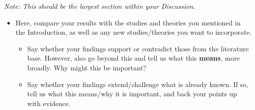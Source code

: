 \documentclass[
  english,
  letterpaper,
  DIV=11,
  numbers=noendperiod]{scrreprt}
\providecommand{\tightlist}{%
  \setlength{\itemsep}{0pt}\setlength{\parskip}{0pt}}
\begin{document}
\emph{Note: This should be the largest section within your Discussion.}

\begin{itemize}
\tightlist
\item
  Here, compare your results with the studies and theories you mentioned
  in the Introduction, as well as any new studies/theories you want to
  incorporate.

  \begin{itemize}
  \tightlist
  \item
    Say whether your findings support or contradict those from the
    literature base. However, also go beyond this and tell us what this
    \textbf{means}, more broadly. Why might this be important?
  \item
    Say whether your findings extend/challenge what is already known. If
    so, tell us what this means/why it is important, and back your
    points up with evidence.
  \end{itemize}
\end{itemize}
\end{document}
